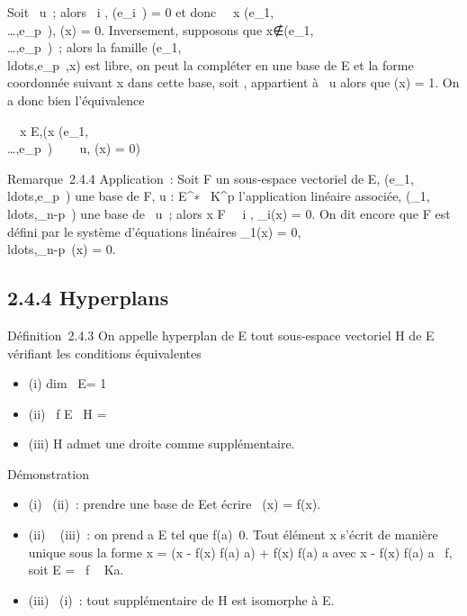 \documentclass[]{article}
\begin{document}
Soit \phi \in\mathrmKer~u~; alors
\forall~i \in [1,p], \phi(e_i~) = 0 et donc
\forall~~x
\in\mathrmVect(e_1,\\\ldots,e_p~),
\phi(x) = 0. Inversement, supposons que
x∉\mathrmVect(e_1,\\\ldots,e_p~)~;
alors la famille
(e_1,\\ldots,e_p~,x)
est libre, on peut la compléter en une base de E et la forme coordonnée
suivant x dans cette base, soit \phi, appartient à
\mathrmKer~u alors que \phi(x)
= 1. On a donc bien l'équivalence

\forall~~x \in E,\quad (x
\in\mathrmVect(e_1,\\\ldots,e_p~)
\Leftrightarrow \forall~~\phi
\in\mathrmKer~u, \phi(x) = 0)

Remarque~2.4.4 Application~: Soit F un sous-espace vectoriel de E,
(e_1,\\ldots,e_p~)
une base de F, u : E^∗\rightarrow~ K^p l'application linéaire
associée,
(\phi_1,\\ldots,\phi_n-p~)
une base de \mathrmKer~u~;
alors x \in F \Leftrightarrow \forall~~i \in
[1,n - p], \phi_i(x) = 0. On dit encore que F est défini par
le système d'équations linéaires \phi_1(x) =
0,\\ldots,\phi_n-p~(x)
= 0.

\subsection{2.4.4 Hyperplans}

Définition~2.4.3 On appelle hyperplan de E tout sous-espace vectoriel H
de E vérifiant les conditions équivalentes

\begin{itemize}
\itemsep1pt\parskip0pt
\item
  (i) dim~ E\diagupH = 1
\item
  (ii) \exists~f \in E
  \diagdown\0\, H =\
  \mathrmKerf
\item
  (iii) H admet une droite comme supplémentaire.
\end{itemize}

Démonstration

\begin{itemize}
\itemsep1pt\parskip0pt
\item
  (i) \rigtharrow~(ii)~: prendre \overlinee une base de E\diagupH et
  écrire \pi~(x) = f(x)\overlinee.
\item
  (ii) \rigtharrow~ (iii)~: on prend a \in E tel que
  f(a)\neq~0. Tout élément x s'écrit de manière
  unique sous la forme x = (x - f(x) \over f(a) a)
  + f(x) \over f(a) a avec x - f(x)
  \over f(a) a
  \in\mathrmKer~f, soit E
  = \mathrmKer~f \oplus~ Ka.
\item
  (iii) \rigtharrow~(i)~: tout supplémentaire de H est isomorphe à E\diagupH.
\end{itemize}
\end{document}
